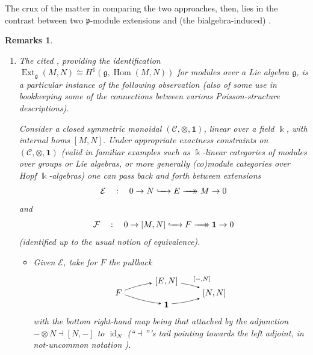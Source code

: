 \documentclass[11pt,leqno]{article}
\theoremstyle{plain}
\theoremstyle{plain}
\theoremstyle{plain}
\newtheorem{remarks}[lemma]{Remarks}
\numberwithin{equation}{section}
\theoremstyle{nonumberplain}
\newcommand\cC{{\mathcal C}}
\newcommand\cE{{\mathcal E}}
\newcommand\cF{{\mathcal F}}
\newcommand\fg{{\mathfrak g}}
\newcommand\fp{{\mathfrak p}}
\newcommand\1{{\bf 1}}
\DeclareMathOperator{\id}{id}
\DeclareMathOperator{\Hom}{\mathrm{Hom}}
\DeclareMathOperator{\Ext}{\mathrm{Ext}}
\newcommand{\xrightarrowdbl}[2][]{%
  \xrightarrow[#1]{#2}\mathrel{\mkern-14mu}\rightarrow
}
\begin{document}
The crux of the matter in comparing the two approaches, then, lies in the contrast between two $\fp$-module extensions  and (the bialgebra-induced) .

\begin{remarks}\label{res:derived.duality}
  \begin{enumerate}[(1),wide]
  \item\label{item:res:derived.duality:drv.dual} The cited \cite[Exercise 7.3.5]{weib_halg}, providing the identification $\Ext_{\fg}(M,N)\cong H^1(\fg,\Hom(M,N))$ for modules over a Lie algebra $\fg$, is a particular instance of the following observation (also of some use in bookkeeping some of the connections between various Poisson-structure descriptions). 
    
    Consider a closed symmetric monoidal $(\cC,\otimes,\mathbf{1})$, linear over a field $\Bbbk$, with \emph{internal homs} $[M,N]$. Under appropriate exactness constraints on $(\cC,\otimes,\mathbf{1})$ (valid in familiar examples such as $\Bbbk$-linear categories of modules over groups or Lie algebras, or more generally (co)module categories over Hopf $\Bbbk$-algebras) one can pass back and forth between extensions
    \begin{equation*}
      \cE\quad:\quad
      0\to
      N
      \lhook\joinrel\xrightarrow{\quad}
      E
      \xrightarrowdbl{\quad}
      M
      \to 0
    \end{equation*}
    and
    \begin{equation*}
      \cF\quad:\quad
      0\to
      [M,N]
      \lhook\joinrel\xrightarrow{\quad}
      F
      \xrightarrowdbl{\quad}
      \mathbf{1}
      \to 0
    \end{equation*}
    (identified up to the usual \cite[\S 3.4]{weib_halg} notion of equivalence).  
    \begin{itemize}[wide]
    \item Given $\cE$, take for $F$ the pullback
      \begin{equation}\label{eq:f1ennn}
        \begin{tikzpicture}[>=stealth,auto,baseline=(current  bounding  box.center)]
          \path[anchor=base] 
          (0,0) node (l) {$F$}
          +(2,.5) node (u) {$[E,N]$}
          +(2,-.5) node (d) {$\mathbf{1}$}
          +(4,0) node (r) {$[N,N]$}
          ;
          \draw[->] (l) to[bend left=6] node[pos=.5,auto] {$\scriptstyle $} (u);
          \draw[->] (u) to[bend left=6] node[pos=.5,auto] {$\scriptstyle [-,N]$} (r);
          \draw[->] (l) to[bend right=6] node[pos=.5,auto,swap] {$\scriptstyle $} (d);
          \draw[->] (d) to[bend right=6] node[pos=.5,auto,swap] {$\scriptstyle $} (r);
        \end{tikzpicture}
      \end{equation}
      with the bottom right-hand map being that attached by the adjunction $-\otimes N\dashv [N,-]$ to $\id_N$ (``$\dashv$'''s tail pointing towards the left adjoint, in not-uncommon notation \cite[Definition 19.3]{ahs}). 


\end{itemize}
\end{enumerate}
\end{remarks}
\end{document}
